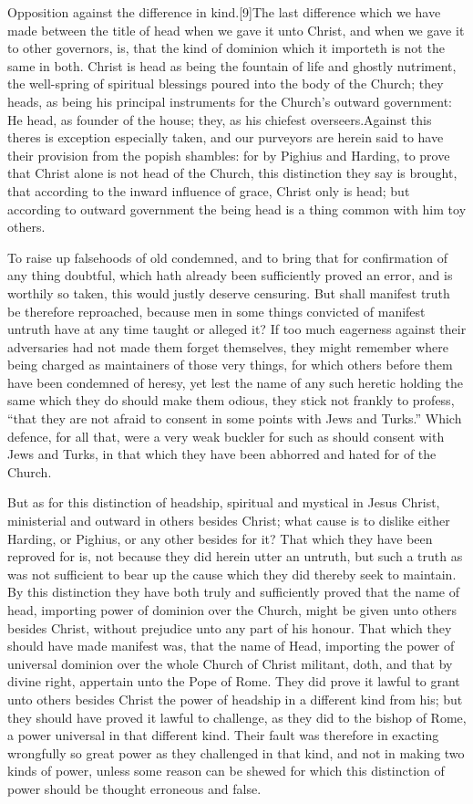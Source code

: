 Opposition against the difference in kind.[9]The last difference which we have made between the title of head when we gave it unto Christ, and when we gave it to other governors, is, that the kind of dominion which it importeth is not the same in both. Christ is head as being the fountain of life and ghostly nutriment, the well-spring of spiritual blessings poured into the body of the Church; they heads, as being his principal instruments for the Church’s outward government: He head, as founder of the house; they, as his chiefest overseers.Against this theres is exception especially taken, and our purveyors are herein said to have their provision from the popish shambles: for by  Pighius and Harding, to prove that Christ alone is not head of the Church, this distinction they say is brought, that according to the inward influence of grace, Christ only is head; but according to outward government the being head is a thing common with him toy others.

To raise up falsehoods of old condemned, and to bring that for confirmation of any thing doubtful, which hath already been sufficiently proved an error, and is worthily so taken, this would justly deserve censuring. But shall manifest truth be therefore reproached, because men in some things convicted of manifest untruth have at any time taught or alleged it? If too much eagerness against their adversaries had not made them forget themselves, they might remember where being charged as maintainers of those very things, for which others before them have been condemned of heresy, yet lest the name of any such heretic holding the same which they do should make them odious, they stick not frankly to profess, “that they are not afraid to consent in some points with Jews and Turks.” Which defence, for all that, were a very weak buckler for such as should consent with Jews and Turks, in that which they have been abhorred and hated for of the Church.

But as for this distinction of headship, spiritual and mystical in Jesus Christ, ministerial and outward in others besides Christ; what cause is to dislike either Harding, or Pighius, or any other besides for it? That which they have been reproved for is, not because they did herein utter an untruth, but such a truth as was not sufficient to bear up the cause which they did thereby seek to maintain. By this distinction they have both truly and sufficiently proved that the name of head, importing power of dominion over the Church, might be given unto others besides Christ, without prejudice unto any part of his honour. That which they should have made  manifest was, that the name of Head, importing the power of universal dominion over the whole Church of Christ militant, doth, and that by divine right, appertain unto the Pope of Rome. They did prove it lawful to grant unto others besides Christ the power of headship in a different kind from his; but they should have proved it lawful to challenge, as they did to the bishop of Rome, a power universal in that different kind. Their fault was therefore in exacting wrongfully so great power as they challenged in that kind, and not in making two kinds of power, unless some reason can be shewed for which this distinction of power should be thought erroneous and false.

